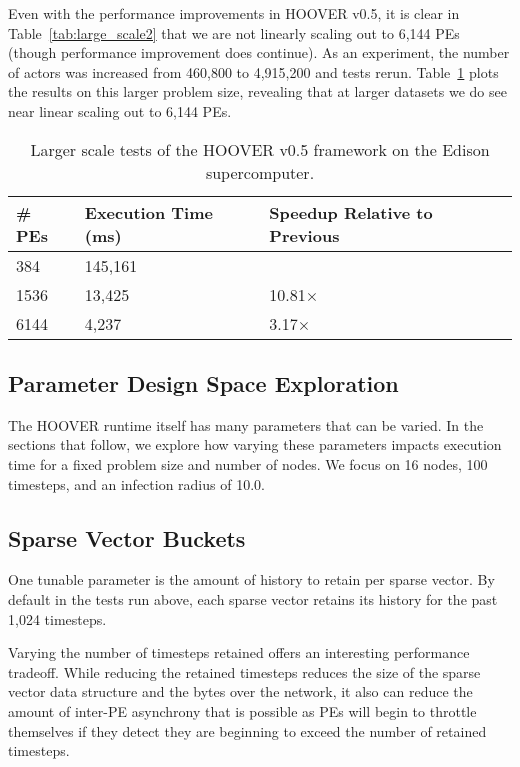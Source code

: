 Even with the performance improvements in HOOVER v0.5, it is clear in
Table~\ref{tab:large_scale2} that we are not linearly scaling out to 6,144 PEs
(though performance improvement does continue). As an experiment, the number of
actors was increased from 460,800 to 4,915,200 and tests rerun.
Table~\ref{tab:large_scale3} plots the results on this larger problem size,
revealing that at larger datasets we do see near linear scaling out to 6,144 PEs.

\begin{table}
\centering
\begin{tabularx}{\textwidth}{ | X || X | X |}
\hline
    \textbf{\# PEs}             & \textbf{Execution Time (ms)} & \textbf{Speedup Relative to Previous} \\\hline
    384                         & 145,161 &               \\\hline
    1536                        & 13,425  & 10.81$\times$ \\\hline
    6144                        & 4,237   & 3.17$\times$  \\\hline
\end{tabularx}
\caption{Larger scale tests of the HOOVER v0.5 framework on the Edison supercomputer.}
\label{tab:large_scale3}
\end{table}

\subsection{Parameter Design Space Exploration}

The HOOVER runtime itself has many parameters that can be varied. In the
sections that follow, we explore how varying these parameters impacts execution
time for a fixed problem size and number of nodes. We focus on 16 nodes, 100
timesteps, and an infection radius of 10.0.

\subsection{Sparse Vector Buckets}

One tunable parameter is the amount of history to retain per sparse vector. By
default in the tests run above, each sparse vector retains its history for the
past 1,024 timesteps.

Varying the number of timesteps retained offers an interesting performance
tradeoff. While reducing the retained timesteps reduces the size of the sparse
vector data structure and the bytes over the network, it also can reduce the amount
of inter-PE asynchrony that is possible as PEs will begin to throttle themselves
if they detect they are beginning to exceed the number of retained timesteps.

